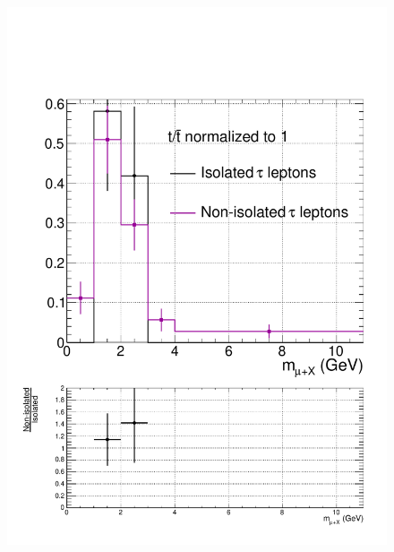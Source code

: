 \begin{figure}[hbtp]
  \begin{center}
    \includegraphics[width=0.6\cmsFigWidth]{figures/isoVsNonIsoTaus_SingleTop_highMT_v87}

\end{center}
\end{figure}
